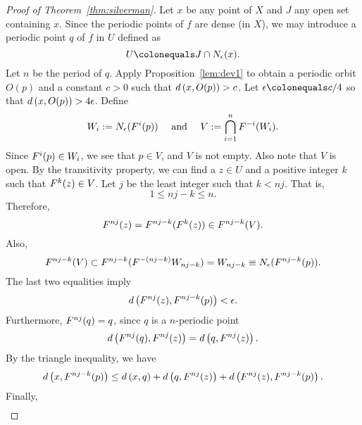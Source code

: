 \documentclass[10pt,draft,twoside]{book}
\begin{document}
\begin{proof}[Proof of Theorem~\ref{thm:silverman}]
  Let $x$ be any point of $X$ and $J$ any open set containing $x$.
  Since the periodic points of $f$ are dense (in $X$), we may introduce a periodic point
  $q$ of $f$ in $U$ defined as
  \begin{equation*}
    U \ceq J\cap \oball{\epsilon}{x}.
  \end{equation*}
  Let $n$ be the period of $q$.
  Apply Proposition~\ref{lem:dev1} to obtain a periodic orbit $O(p)$ and a constant $c > 0$ such that $d\left( x, O(p) \right) > c$.
  Let $\epsilon \ceq c/4$ so that $d\left( x, O(p) \right) > 4\epsilon$.
  Define
  \begin{equation*}
    W_i := N_{\epsilon}(F^{i}(p)) \quad\text{ and }\quad V := \bigcap\limits_{i = 1}^{n} F^{-i}(W_i).
  \end{equation*}
  Since $F^{i}(p) \in W_i$, we see that $p \in V$, and $V$ is not empty. 
  Also note that $V$ is open.
  By the transitivity property, we can find a $z\in U$ and a positive integer $k$ such that
  $F^{k}(z) \in V$. Let $j$ be the least integer such that $k < nj$. 
  That is,
  \begin{equation*}
    1 \leq nj - k \leq n.
  \end{equation*}
  Therefore,
  \begin{equation*}
    F^{nj} (z) = F^{nj - k} (F^{k}(z)) \in F^{nj-k}(V).
  \end{equation*}
  Also,
  \begin{equation*}
    F^{nj - k}(V) \subset F^{nj - k}(F^{-(nj - k)} W_{nj-k}) 
    = W_{nj-k}
    \equiv N_{\epsilon}(F^{nj-k}(p)).
  \end{equation*}
  The last two equalities imply
  \begin{equation*}
    d\left( F^{nj}(z), F^{nj - k}(p) \right) < \epsilon.
  \end{equation*}
  Furthermore, $F^{nj}(q) = q$, since $q$ is a $n$-periodic point 
  \begin{equation*}
    d\left( F^{nj}(q), F^{nj}(z) \right) = d\left( q, F^{nj}(z) \right).
  \end{equation*}
  By the triangle inequality, we have
  \begin{equation*}
    d\left( x, F^{nj-k}(p) \right) \leq d\left( x,q \right) + d\left( q, F^{nj}(z) \right) + d\left( F^{nj}(z), F^{nj - k}(p) \right).
  \end{equation*}
  Finally, 
  \begin{align*}

\end{align*}
\end{proof}
\end{document}
